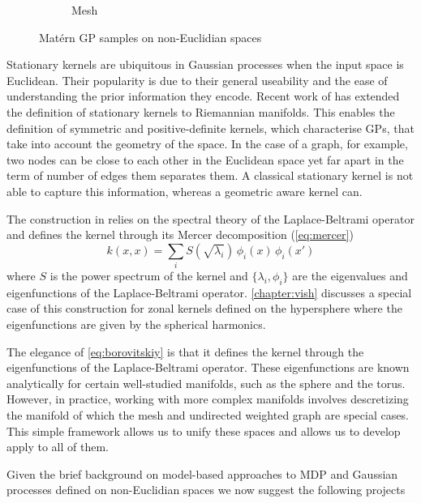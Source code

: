 \begin{figure}[tbh!]
\begin{subfigure}{0.3\textwidth}
  \caption{Mesh}
  \label{fig:mesh}
\end{subfigure}
\caption{Mat\'ern GP samples on non-Euclidian spaces}
\label{fig:xxxx}
\end{figure}

Stationary kernels are ubiquitous in Gaussian processes when the input space is Euclidean. Their popularity is due to their general useability and the ease of understanding the prior information they encode. Recent work of \citet{Borovitskiy2020} has extended the definition of stationary kernels to Riemannian manifolds. This enables the definition of symmetric and positive-definite kernels, which characterise GPs, that take into account the geometry of the space. In the case of a graph, for example, two nodes can be close to each other in the Euclidean space yet far apart in the term of number of edges them separates them. A classical stationary kernel is not able to capture this information, whereas a geometric aware kernel can.

The construction in \citet{Borovitskiy2020} relies on the spectral theory of the Laplace-Beltrami operator and defines the kernel through its Mercer decomposition (\cref{eq:mercer})
\begin{equation}
    \label{eq:borovitskiy}
    k(x, x) = \sum_i S(\sqrt{\lambda_i})\,\phi_i(x)\,\phi_i(x')
\end{equation}
where $S$ is the power spectrum of the kernel and $\{\lambda_i, \phi_i\}$ are the eigenvalues and eigenfunctions of the Laplace-Beltrami operator. \cref{chapter:vish} discusses a special case of this construction for zonal kernels defined on the hypersphere where the eigenfunctions are given by the spherical harmonics.

The elegance of \cref{eq:borovitskiy} is that it defines the kernel through the eigenfunctions of the Laplace-Beltrami operator. These eigenfunctions are known analytically for certain well-studied manifolds, such as the sphere and the torus. However, in practice, working with more complex manifolds involves descretizing the manifold of which the mesh and undirected weighted graph are special cases. This simple framework allows us to unify these spaces and allows us to develop apply to all of them.

Given the brief background on model-based approaches to MDP and Gaussian processes defined on non-Euclidian spaces we now suggest the following projects 

